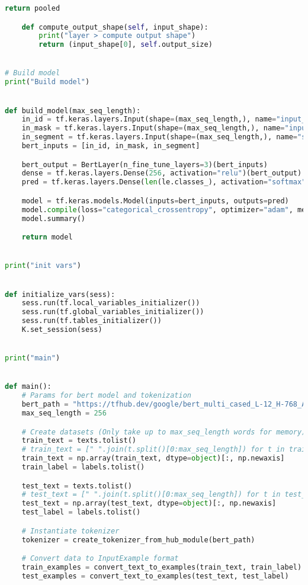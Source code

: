 \begin{lstlisting}[language=Python, caption=My attempt to adapt BERT to short text classification]
        return pooled

    def compute_output_shape(self, input_shape):
        print("layer > compute output shape")
        return (input_shape[0], self.output_size)


# Build model
print("Build model")


def build_model(max_seq_length):
    in_id = tf.keras.layers.Input(shape=(max_seq_length,), name="input_ids")
    in_mask = tf.keras.layers.Input(shape=(max_seq_length,), name="input_masks")
    in_segment = tf.keras.layers.Input(shape=(max_seq_length,), name="segment_ids")
    bert_inputs = [in_id, in_mask, in_segment]

    bert_output = BertLayer(n_fine_tune_layers=3)(bert_inputs)
    dense = tf.keras.layers.Dense(256, activation="relu")(bert_output)
    pred = tf.keras.layers.Dense(len(le.classes_), activation="softmax")(dense)

    model = tf.keras.models.Model(inputs=bert_inputs, outputs=pred)
    model.compile(loss="categorical_crossentropy", optimizer="adam", metrics=["accuracy"])
    model.summary()

    return model


print("init vars")


def initialize_vars(sess):
    sess.run(tf.local_variables_initializer())
    sess.run(tf.global_variables_initializer())
    sess.run(tf.tables_initializer())
    K.set_session(sess)


print("main")


def main():
    # Params for bert model and tokenization
    bert_path = "https://tfhub.dev/google/bert_multi_cased_L-12_H-768_A-12/1"
    max_seq_length = 256

    # Create datasets (Only take up to max_seq_length words for memory)
    train_text = texts.tolist()
    # train_text = [" ".join(t.split()[0:max_seq_length]) for t in train_text]
    train_text = np.array(train_text, dtype=object)[:, np.newaxis]
    train_label = labels.tolist()

    test_text = texts.tolist()
    # test_text = [" ".join(t.split()[0:max_seq_length]) for t in test_text]
    test_text = np.array(test_text, dtype=object)[:, np.newaxis]
    test_label = labels.tolist()

    # Instantiate tokenizer
    tokenizer = create_tokenizer_from_hub_module(bert_path)

    # Convert data to InputExample format
    train_examples = convert_text_to_examples(train_text, train_label)
    test_examples = convert_text_to_examples(test_text, test_label)


\end{lstlisting}
